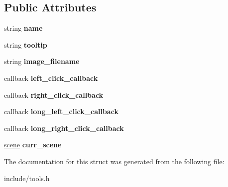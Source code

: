 \subsection*{Public Attributes}
\begin{DoxyCompactItemize}
\item 
\mbox{\label{structtool_a632b7dce088583cac63d437290943648}} 
string {\bfseries name}
\item 
\mbox{\label{structtool_a2a2d0a25a5fee34c86e74a4530df537d}} 
string {\bfseries tooltip}
\item 
\mbox{\label{structtool_a7f4748e280d1bead612bc126c77205c6}} 
string {\bfseries image\+\_\+filename}
\item 
\mbox{\label{structtool_ae64f437bc4f89ca9a173bf956c88f979}} 
callback {\bfseries left\+\_\+click\+\_\+callback}
\item 
\mbox{\label{structtool_aea49ffe92b5d3b78484f9449b7d512db}} 
callback {\bfseries right\+\_\+click\+\_\+callback}
\item 
\mbox{\label{structtool_af088e01057236082f37a5269e80b97b8}} 
callback {\bfseries long\+\_\+left\+\_\+click\+\_\+callback}
\item 
\mbox{\label{structtool_ac0a23e07fc63fac55f870aeca6772872}} 
callback {\bfseries long\+\_\+right\+\_\+click\+\_\+callback}
\item 
\mbox{\label{structtool_af5da15ac3aee77dd9ac66d5b01343040}} 
\hyperlink{classscene}{scene} {\bfseries curr\+\_\+scene}
\end{DoxyCompactItemize}


The documentation for this struct was generated from the following file\+:\begin{DoxyCompactItemize}
\item 
include/tools.\+h\end{DoxyCompactItemize}
